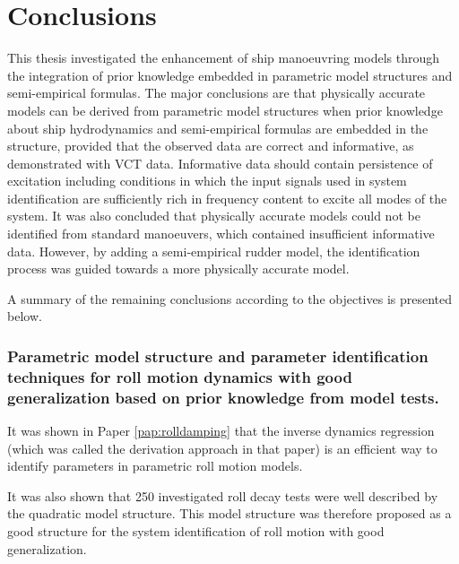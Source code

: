 \chapter{Conclusions\label{ch:conclusions}}

\noindent This thesis investigated the enhancement of ship manoeuvring models through the integration of prior knowledge embedded in parametric model structures and semi-empirical formulas. The major conclusions are that physically accurate models can be derived from parametric model structures when prior knowledge about ship hydrodynamics and semi-empirical formulas are embedded in the structure, provided that the observed data are correct and informative, as demonstrated with VCT data. Informative data should contain persistence of excitation including conditions in which the input signals used in system identification are sufficiently rich in frequency content to excite all modes of the system.
It was also concluded that physically accurate models could not be identified from standard manoeuvers, which contained insufficient informative data. However, by adding a semi-empirical rudder model, the identification process was guided towards a more physically accurate model.

A summary of the remaining conclusions according to the objectives is presented below.

\subsection*{Parametric model structure and parameter identification techniques for roll motion dynamics with good generalization based on prior knowledge from model tests.}
It was shown in Paper \ref{pap:rolldamping} that the inverse dynamics regression (which was called the derivation approach in that paper) is an efficient way to identify parameters in parametric roll motion models. 

It was also shown that 250 investigated roll decay tests were well described by the quadratic model structure. This model structure was therefore proposed as a good structure for the system identification of roll motion with good generalization.  

